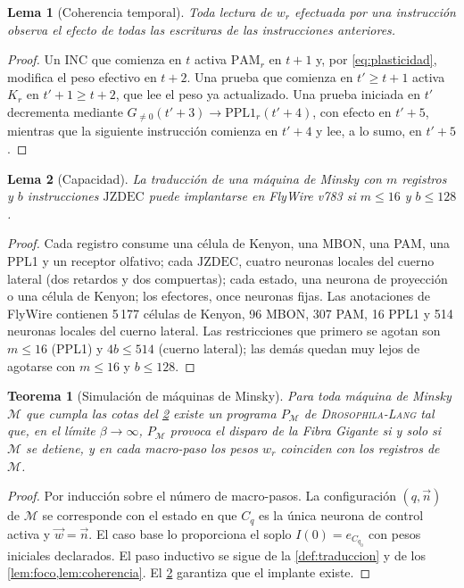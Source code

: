 \documentclass[11pt,a4paper]{article}
\theoremstyle{plain}
\newtheorem{teorema}{Teorema}
\newtheorem{lema}{Lema}
\theoremstyle{definition}
\theoremstyle{remark}
\newcommand{\dros}{\textup{\textsc{Drosophila-Lang}}}
\newcommand{\PAM}{\mathrm{PAM}}
\newcommand{\PPL}{\mathrm{PPL1}}
\begin{document}
\begin{lema}[Coherencia temporal]
\label{lem:coherencia}
Toda lectura de $w_r$ efectuada por una instrucción observa el efecto de
todas las escrituras de las instrucciones anteriores.
\end{lema}
\begin{proof}
Un $\mathrm{INC}$ que comienza en $t$ activa $\PAM_r$ en $t+1$ y, por
\eqref{eq:plasticidad}, modifica el peso efectivo en $t+2$. Una prueba que
comienza en $t'\ge t+1$ activa $K_r$ en $t'+1\ge t+2$, que lee el peso ya
actualizado. Una prueba iniciada en $t'$ decrementa mediante $G_{\neq0}(t'+3)
\to\PPL_r(t'+4)$, con efecto en $t'+5$, mientras que la siguiente instrucción
comienza en $t'+4$ y lee, a lo sumo, en $t'+5$.
\end{proof}

\begin{lema}[Capacidad]
\label{lem:capacidad}
La traducción de una máquina de Minsky con $m$ registros y $b$ instrucciones
$\mathrm{JZDEC}$ puede implantarse en FlyWire v783 si $m\le16$ y $b\le128$.
\end{lema}
\begin{proof}
Cada registro consume una célula de Kenyon, una MBON, una PAM, una PPL1 y un
receptor olfativo; cada $\mathrm{JZDEC}$, cuatro neuronas locales del cuerno
lateral (dos retardos y dos compuertas); cada estado, una neurona de
proyección o una célula de Kenyon; los efectores, once neuronas fijas. Las
anotaciones de FlyWire contienen 5\,177 células de Kenyon, 96 MBON, 307 PAM,
16 PPL1 y 514 neuronas locales del cuerno lateral. Las restricciones que
primero se agotan son $m\le16$ (PPL1) y $4b\le514$ (cuerno lateral); las
demás quedan muy lejos de agotarse con $m\le16$ y $b\le128$.
\end{proof}

\begin{teorema}[Simulación de máquinas de Minsky]
\label{thm:simulacion}
Para toda máquina de Minsky $\mathcal M$ que cumpla las cotas del
\cref{lem:capacidad} existe un programa $P_{\mathcal M}$ de \dros{} tal que,
en el límite $\beta\to\infty$, $P_{\mathcal M}$ provoca el disparo de la
Fibra Gigante si y solo si $\mathcal M$ se detiene, y en cada macro-paso los
pesos $w_r$ coinciden con los registros de $\mathcal M$.
\end{teorema}
\begin{proof}
Por inducción sobre el número de macro-pasos. La configuración $(q,\vec n)$
de $\mathcal M$ se corresponde con el estado en que $C_q$ es la única neurona
de control activa y $\vec w=\vec n$. El caso base lo proporciona el soplo
$I(0)=e_{C_{q_0}}$ con pesos iniciales declarados. El paso inductivo se sigue
de la \cref{def:traduccion} y de los \cref{lem:foco,lem:coherencia}. El
\cref{lem:capacidad} garantiza que el implante existe.
\end{proof}
\end{document}
